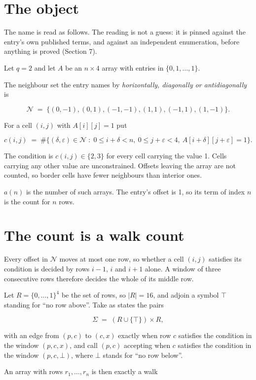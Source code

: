 \documentclass[11pt]{article}
\theoremstyle{definition}
\begin{document}
\section{The object}

The name is read as follows. The reading is not a guess: it is pinned against the entry's own published terms, and against an independent enumeration, before anything is proved (Section 7).

Let $q = 2$ and let $A$ be an $n \times 4$ array with entries in $\{0,1,\dots,1\}$.

The neighbour set the entry names by {\itshape horizontally, diagonally or antidiagonally} is

\[\mathcal{N} \;=\; \{(0,-1), (0,1), (-1,-1), (1,1), (-1,1), (1,-1)\}.\]

For a cell $(i,j)$ with $A[i][j] = 1$ put

\[c(i,j) \;=\; \#\bigl\{(\delta,\varepsilon)\in\mathcal{N} \;:\; 0\le i+\delta<n,\ 0\le j+\varepsilon<4,\ A[i+\delta][j+\varepsilon] = 1\bigr\}.\]

The condition is $c(i,j) \in \{2, 3\}$ for every cell carrying the value 1. Cells carrying any other value are unconstrained. Offsets leaving the array are not counted, so border cells have fewer neighbours than interior ones.

$a(n)$ is the number of such arrays. The entry's offset is 1, so its term of index $n$ is the count for $n$ rows.

\section{The count is a walk count}

Every offset in $\mathcal{N}$ moves at most one row, so whether a cell $(i,j)$ satisfies its condition is decided by rows $i-1$, $i$ and $i+1$ alone. A window of three consecutive rows therefore decides the whole of its middle row.

Let $R = \{0,\dots,1\}^{4}$ be the set of rows, so $|R| = 16$, and adjoin a symbol $\top$ standing for ``no row above''. Take as states the pairs

\[\Sigma \;=\; (R \cup \{\top\}) \times R,\]

with an edge from $(p,c)$ to $(c,x)$ exactly when row $c$ satisfies the condition in the window $(p,c,x)$, and call $(p,c)$ accepting when $c$ satisfies the condition in the window $(p,c,\bot)$, where $\bot$ stands for ``no row below''.

An array with rows $r_1,\dots,r_n$ is then exactly a walk
\end{document}
